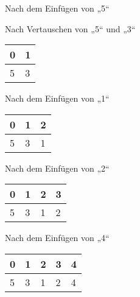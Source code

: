 \documentclass{lehramt-informatik-aufgabe}
\begin{document}
\begin{enumerate}
\begin{enumerate}
\begin{liDiagramm}{Nach dem Einfügen von „5“}
\end{liDiagramm}

\begin{liDiagramm}{Nach Vertauschen von „5“ und „3“}
\begin{tabular}{ll}
\bf{0} & \bf{1} \\
\hline
5      & 3      \\
\end{tabular}

\end{liDiagramm}

\begin{liDiagramm}{Nach dem Einfügen von „1“}
\begin{tabular}{lll}
\bf{0} & \bf{1} & \bf{2} \\
\hline
5      & 3      & 1      \\
\end{tabular}

\end{liDiagramm}

\begin{liDiagramm}{Nach dem Einfügen von „2“}
\begin{tabular}{llll}
\bf{0} & \bf{1} & \bf{2} & \bf{3} \\
\hline
5      & 3      & 1      & 2      \\
\end{tabular}

\end{liDiagramm}

\begin{liDiagramm}{Nach dem Einfügen von „4“}
\begin{tabular}{lllll}
\bf{0} & \bf{1} & \bf{2} & \bf{3} & \bf{4} \\
\hline
5      & 3      & 1      & 2      & 4      \\
\end{tabular}


\end{liDiagramm}
\end{enumerate}
\end{enumerate}
\end{document}
